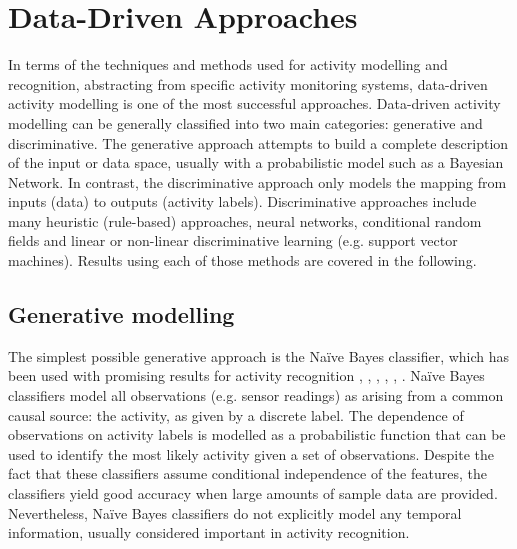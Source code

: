 \section{Data-Driven Approaches}
\label{sec:soa:datadriven}

In terms of the techniques and methods used for activity modelling and recognition, abstracting from specific activity monitoring systems, data-driven activity modelling is one of the most successful approaches. Data-driven activity modelling can be generally classified into two main categories: generative and discriminative. The generative approach attempts to build a complete description of the input or data space, usually with a probabilistic model such as a Bayesian Network. In contrast, the discriminative approach only models the mapping from inputs (data) to outputs (activity labels). Discriminative approaches include many heuristic (rule-based) approaches, neural networks, conditional random fields and linear or non-linear discriminative learning (e.g. support vector machines). Results using each of those methods are covered in the following.

\subsection{Generative modelling}

The simplest possible generative approach is the Na\"ive Bayes classifier, which has been used with promising results for activity recognition \cite{Bao2004}, \cite{Brdiczka2007}, \cite{Cook2009}, \cite{Tapia2004}, \cite{Kasteren2007}, \cite{Maurer2006a}. Na\"ive Bayes classifiers model all observations (e.g. sensor readings) as arising from a common causal source: the activity, as given by a discrete label. The dependence of observations on activity labels is modelled as a probabilistic function that can be used to identify the most likely activity given a set of observations. Despite the fact that these classifiers assume conditional independence of the features, the classifiers yield good accuracy when large amounts of sample data are provided. Nevertheless, Na\"ive Bayes classifiers do not explicitly model any temporal information, usually considered important in activity recognition.

